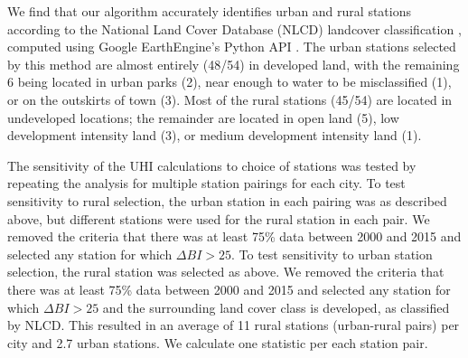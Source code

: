 We find that our algorithm accurately identifies urban and rural stations according to the National Land Cover Database (NLCD) landcover classification \cite{homer2015completion}, computed using Google EarthEngine's Python API \cite{gorelick2017google}. The urban stations selected by this method are almost entirely (48/54) in developed land, with the remaining 6 being located in urban parks (2), near enough to water to be misclassified (1), or on the outskirts of town (3). Most of the rural stations (45/54) are located in undeveloped locations; the remainder are located in open land (5), low development intensity land (3), or medium development intensity land (1). 

The sensitivity of the UHI calculations to choice of stations was tested by repeating the analysis for multiple station pairings for each city. To test sensitivity to rural selection, the urban station in each pairing was as described above, but different stations were used for the rural station in each pair. We removed the criteria that there was at least 75\% data between 2000 and 2015 and selected any station for which $\Delta BI > 25$. To test sensitivity to urban station selection, the rural station was selected as above. We removed the criteria that there was at least 75\% data between 2000 and 2015 and selected any station for which $\Delta BI > 25$ and the surrounding land cover class is developed, as classified by NLCD. This resulted in an average of 11 rural stations (urban-rural pairs) per city and 2.7 urban stations. We calculate one statistic per each station pair. 

